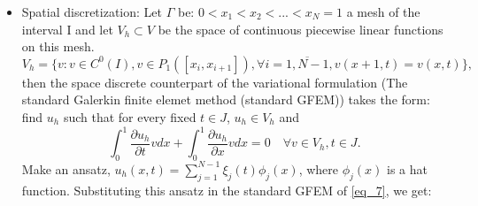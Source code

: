 \documentclass[a4paper,10pt,twoside]{article}
\begin{document}
\begin{itemize}
    \item Spatial discretization:
    Let $ \Gamma  $ be: $0 < {x  }_{ 1 } < {x  }_{ 2 } < ... < {x  }_{ N }=1$ a mesh of the interval I and let ${ V }_{h  } \subset  V$ be the space of continuous piecewise linear functions on this mesh.
    \begin{equation}
        V_h = \{v: v \in C^0 (I), v \in P_1([x_i,x_{i+1}]), \forall i=\overline{1,N-1},v(x+1,t)=v(x,t) \},
        \label{eq_6}
    \end{equation}
    then the space discrete counterpart of the variational formulation (The standard Galerkin finite elemet method (standard GFEM)) takes the form: find $u_h$ such that for every fixed $t \in J$, $u_h \in V_h$ and
\begin{equation}
    \int_0^1 \frac{\partial u_h}{\partial t}v dx+ \int_0^1 \frac{\partial u_h}{\partial x}v dx= 0 \quad\forall v \in V_h,  t \in J.
      \label{eq_7}
\end{equation}
Make an ansatz, $u_h(x,t) = \sum\limits_{j=1}^{N-1} \xi_j(t)\phi_j(x)$, where $\phi_j(x)$ is a hat function. Substituting this ansatz in the standard GFEM of \ref{eq_7}, we get:


\end{itemize}
\end{document}
